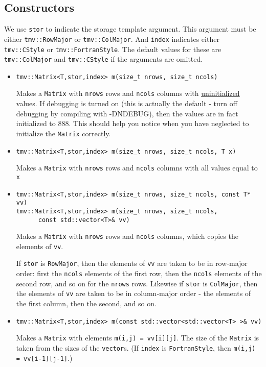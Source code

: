 \documentclass[twoside,letterpaper,11pt]{article}
\renewcommand{\tt}[1]{{\texttt {#1}}}
\begin{document}
\subsection{Constructors}

We use \tt{stor} to indicate the storage template argument. 
This argument must be either 
\tt{tmv::RowMajor} or \tt{tmv::ColMajor}.  And \tt{index} indicates either 
\tt{tmv::CStyle} or \tt{tmv::FortranStyle}.  The default values for these
are \tt{tmv::ColMajor} and \tt{tmv::CStyle} if the arguments are omitted.

\begin{itemize}
\item 
\begin{verbatim}
tmv::Matrix<T,stor,index> m(size_t nrows, size_t ncols)
\end{verbatim}
Makes a \tt{Matrix} with \tt{nrows} rows and \tt{ncols} columns with 
\underline{uninitialized} values.
If debugging is turned on (this is actually the default -
turn off debugging by compiling
with -DNDEBUG), then the values are in fact initialized to 888.  
This should help you notice
when you have neglected to initialize the \tt{Matrix} correctly.

\item
\begin{verbatim}
tmv::Matrix<T,stor,index> m(size_t nrows, size_t ncols, T x)
\end{verbatim}
Makes a \tt{Matrix} with \tt{nrows} rows and \tt{ncols} columns with all 
values equal to \tt{x}

\item
\begin{verbatim}
tmv::Matrix<T,stor,index> m(size_t nrows, size_t ncols, const T* vv)
tmv::Matrix<T,stor,index> m(size_t nrows, size_t ncols, 
      const std::vector<T>& vv)
\end{verbatim}
Makes a \tt{Matrix} with \tt{nrows} rows and \tt{ncols} columns,
which copies the elements of \tt{vv}.

If \tt{stor} is \tt{RowMajor}, then the elements of \tt{vv} are taken to
be in row-major order: first the \tt{ncols} elements of the first row, then the
\tt{ncols} elements of the second row, and so on for the \tt{nrows} rows.
Likewise if \tt{stor} is \tt{ColMajor},
then the elements of \tt{vv} are taken to be in column-major order - 
the elements of the first column, then the second, and so on.

\item
\begin{verbatim}
tmv::Matrix<T,stor,index> m(const std::vector<std::vector<T> >& vv)
\end{verbatim}
Makes a \tt{Matrix} with elements \tt{m(i,j) = vv[i][j]}.  The size of
the \tt{Matrix} is taken from the sizes of the \tt{vector}s.  
(If \tt{index} is \tt{FortranStyle}, then \tt{m(i,j) = vv[i-1][j-1]}.)


\end{itemize}
\end{document}
